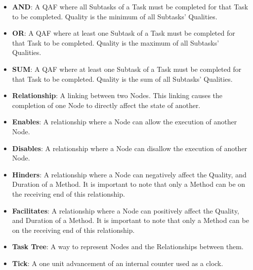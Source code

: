 \begin{itemize}
\item{\textbf{AND}: A QAF where all Subtasks of a Task must be completed for that Task to be completed. Quality is the minimum of all Subtasks' Qualities.}

\item{\textbf{OR}: A QAF where at least one Subtask of a Task must be completed for that Task to be completed. Quality is the maximum of all Subtasks' Qualities.}

\item{\textbf{SUM}: A QAF where at least one Subtask of a Task must be completed for that Task to be completed. Quality is the sum of all Subtasks' Qualities.}

\item{\textbf{Relationship}: A linking between two Nodes. This linking causes the completion of one Node to directly affect the state of another.}

\item{\textbf{Enables}: A relationship where a Node can allow the execution of another Node.}

\item{\textbf{Disables}: A relationship where a Node can disallow the execution of another Node.}

\item{\textbf{Hinders}: A relationship where a Node can negatively affect the Quality, and Duration of a Method. It is important to note that only a Method can be on the receiving end of this relationship.}

\item{\textbf{Facilitates}: A relationship where a Node can positively affect the Quality, and Duration of a Method. It is important to note that only a Method can be on the receiving end of this relationship.}

\item{\textbf{Task Tree}: A way to represent Nodes and the Relationships between them.}

\item{\textbf{Tick}: A one unit advancement of an internal counter used as a clock.}

\end{itemize}